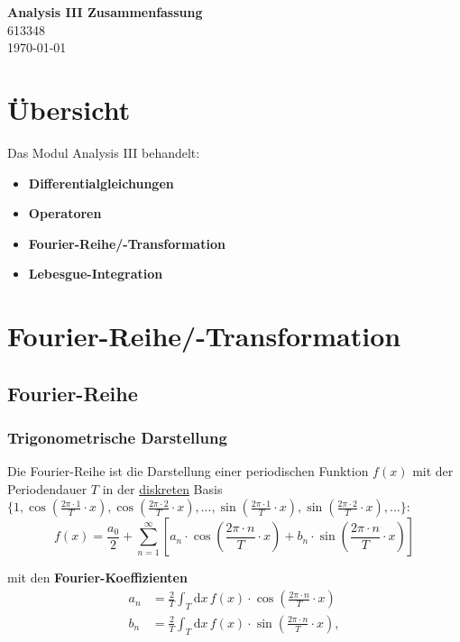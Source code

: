 \documentclass{article}
\newcommand{\diff}{\mathrm{d}}
\newcommand{\lr}[1]{\left(#1\right)}
\newcommand{\lreck}[1]{\left[#1\right]}
\begin{document}
\begin{center}
	\Large{\textbf{Analysis III Zusammenfassung}}\\
	\small{613348}\\
	\today
\end{center}

\tableofcontents


\newpage


\section*{Übersicht}
Das Modul Analysis III behandelt:
	\begin{itemize}
		\item \textbf{Differentialgleichungen}
		
		
		\item \textbf{Operatoren}
		
		
		\item \textbf{Fourier-Reihe/-Transformation}
		
		
		\item \textbf{Lebesgue-Integration}
	\end{itemize}


\newpage


\section{Fourier-Reihe/-Transformation}
\subsection{Fourier-Reihe}
\subsubsection{Trigonometrische Darstellung}
Die Fourier-Reihe ist die Darstellung einer periodischen Funktion $f(x)$ mit der Periodendauer $T$ in der \underline{diskreten} Basis $\{1, \cos \lr{ \frac{2\pi \cdot 1}{T} \cdot x }, \cos \lr{ \frac{2\pi \cdot 2}{T} \cdot x}, ..., \sin \lr{ \frac{2\pi \cdot 1}{T} \cdot x }, \sin \lr{ \frac{2\pi \cdot 2}{T} \cdot x }, ... \}$:
	\begin{equation}
		f(x) = \frac{a_0}{2} + \sum_{n=1}^\infty \lreck{ a_n \cdot \cos \lr{ \frac{2\pi \cdot n}{T} \cdot x } + b_n \cdot \sin \lr{ \frac{2\pi \cdot n}{T} \cdot x } }
	\end{equation}

mit den \textbf{Fourier-Koeffizienten}
	\begin{align}
		a_n &= \frac{2}{T} \int_T \diff x \, f(x) \cdot \cos \lr{ \frac{2\pi \cdot n}{T} \cdot x } \\
		b_n &= \frac{2}{T} \int_T \diff x \, f(x) \cdot \sin \lr{ \frac{2\pi \cdot n}{T} \cdot x },
	\end{align}
\end{document}
